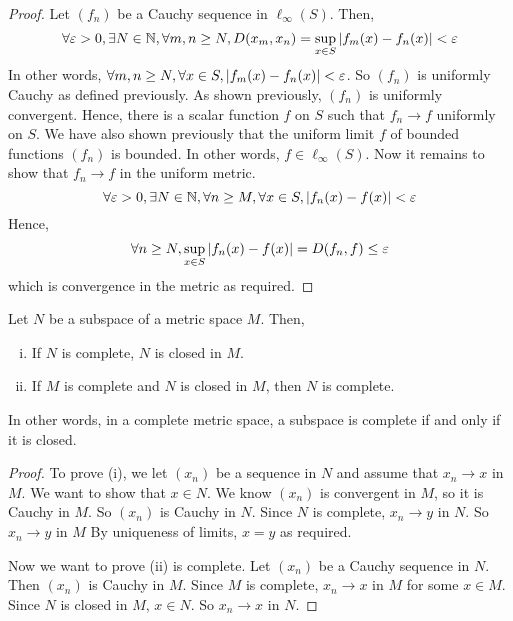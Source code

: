 \begin{proof}
    Let \( (f_n) \) be a Cauchy sequence in \( \ell_\infty(S) \).
    Then,
    \[ \forall \varepsilon > 0, \exists N \in \mathbb N, \forall m,n \geq N, D(x_m, x_n) = \sup_{x \in S} \abs{f_m(x) - f_n(x)} < \varepsilon \]
    In other words, \( \forall m,n \geq N, \forall x \in S, \abs{f_m(x) - f_n(x)} < \varepsilon \).
    So \( (f_n) \) is uniformly Cauchy as defined previously.
    As shown previously, \( (f_n) \) is uniformly convergent.
    Hence, there is a scalar function \( f \) on \( S \) such that \( f_n \to f \) uniformly on \( S \).
    We have also shown previously that the uniform limit \( f \) of bounded functions \( (f_n) \) is bounded.
    In other words, \( f \in \ell_\infty(S) \).
    Now it remains to show that \( f_n \to f \) in the uniform metric.
    \[ \forall \varepsilon > 0, \exists N \in \mathbb N, \forall n \geq M, \forall x \in S, \abs{f_n(x) - f(x)} < \varepsilon \]
    Hence,
    \[ \forall n \geq N, \sup_{x \in S} \abs{f_n(x) - f(x)} = D(f_n,f) \leq \varepsilon \]
    which is convergence in the metric as required.
\end{proof}
\begin{proposition}
    Let \( N \) be a subspace of a metric space \( M \).
    Then,
    \begin{enumerate}[(i)]
        \item If \( N \) is complete, \( N \) is closed in \( M \).
        \item If \( M \) is complete and \( N \) is closed in \( M \), then \( N \) is complete.
    \end{enumerate}
    In other words, in a complete metric space, a subspace is complete if and only if it is closed.
\end{proposition}
\begin{proof}
    To prove (i), we let \( (x_n) \) be a sequence in \( N \) and assume that \( x_n \to x \) in \( M \).
    We want to show that \( x \in N \).
    We know \( (x_n) \) is convergent in \( M \), so it is Cauchy in \( M \).
    So \( (x_n) \) is Cauchy in \( N \).
    Since \( N \) is complete, \( x_n \to y \) in \( N \).
    So \( x_n \to y \) in \( M \)
    By uniqueness of limits, \( x = y \) as required.

    Now we want to prove (ii) is complete.
    Let \( (x_n) \) be a Cauchy sequence in \( N \).
    Then \( (x_n) \) is Cauchy in \( M \).
    Since \( M \) is complete, \( x_n \to x \) in \( M \) for some \( x \in M \).
    Since \( N \) is closed in \( M \), \( x \in N \).
    So \( x_n \to x \) in \( N \).
\end{proof}
